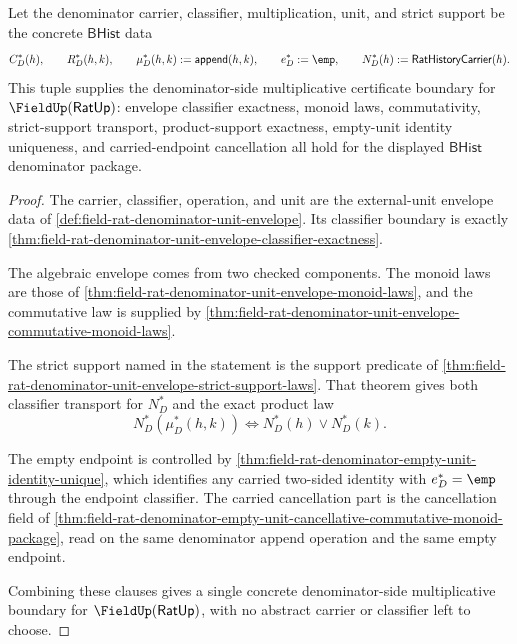 \begin{theorem}
\label{thm:field-rat-denominator-fieldup-multiplicative-certificate-boundary}
Let the denominator carrier, classifier, multiplication, unit, and strict
support be the concrete $\mathsf{BHist}$ data
$$
C_D^\ast(h),\qquad
R_D^\ast(h,k),\qquad
\mu_D^\ast(h,k):=\mathsf{append}(h,k),\qquad
e_D^\ast:=\emp,\qquad
N_D^\ast(h):=\mathsf{RatHistoryCarrier}(h).
$$
This tuple supplies the denominator-side multiplicative certificate boundary
for $\FieldUp(\mathsf{RatUp})$: envelope classifier exactness, monoid laws,
commutativity, strict-support transport, product-support exactness, empty-unit
identity uniqueness, and carried-endpoint cancellation all hold for the
displayed $\mathsf{BHist}$ denominator package.
\end{theorem}
\begin{proof}
The carrier, classifier, operation, and unit are the external-unit envelope
data of \autoref{def:field-rat-denominator-unit-envelope}. Its classifier
boundary is exactly
\autoref{thm:field-rat-denominator-unit-envelope-classifier-exactness}.

The algebraic envelope comes from two checked components. The monoid laws are
those of \autoref{thm:field-rat-denominator-unit-envelope-monoid-laws}, and the
commutative law is supplied by
\autoref{thm:field-rat-denominator-unit-envelope-commutative-monoid-laws}.

The strict support named in the statement is the support predicate of
\autoref{thm:field-rat-denominator-unit-envelope-strict-support-laws}. That
theorem gives both classifier transport for $N_D^\ast$ and the exact product
law
$$
N_D^\ast(\mu_D^\ast(h,k))\Longleftrightarrow
N_D^\ast(h)\lor N_D^\ast(k).
$$

The empty endpoint is controlled by
\autoref{thm:field-rat-denominator-empty-unit-identity-unique}, which identifies
any carried two-sided identity with $e_D^\ast=\emp$ through the endpoint
classifier. The carried cancellation part is the cancellation field of
\autoref{thm:field-rat-denominator-empty-unit-cancellative-commutative-monoid-package},
read on the same denominator append operation and the same empty endpoint.

Combining these clauses gives a single concrete denominator-side
multiplicative boundary for $\FieldUp(\mathsf{RatUp})$, with no abstract carrier
or classifier left to choose.
\end{proof}

